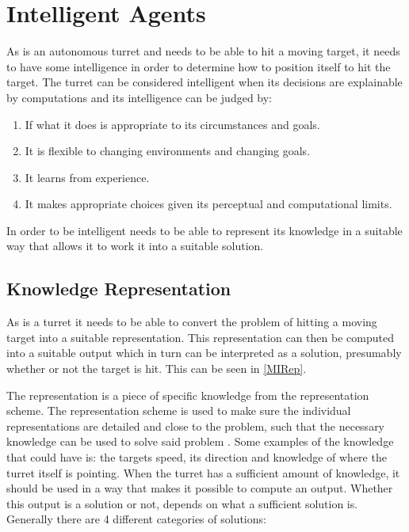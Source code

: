 \section{Intelligent Agents}
 
As \namep is an autonomous turret and needs to be able to hit a moving target,
it needs to have some intelligence in order to determine how to position itself
to hit the target. The turret can be considered intelligent
\citep[ch.1.1]{MIBook} when its decisions are explainable by computations and
its intelligence can be judged by:

\begin{enumerate}
  \item If what it does is appropriate to its circumstances and goals.
  \item It is flexible to changing environments and changing goals.
  \item It learns from experience.
  \item It makes appropriate choices given its perceptual and computational
  limits.
\end{enumerate}

In order to be intelligent \name needs to be able to represent its knowledge in
a suitable way that allows it to work it into a suitable solution. 

\subsection{Knowledge Representation}\label{KR}

As \name is a turret it needs to be able to convert the problem of hitting a
moving target into a suitable representation. This representation can then be
computed into a suitable output which in turn can be interpreted as
a solution, presumably whether or not the target is hit. This can be seen in
\autoref{MIRep}.


The representation is a piece of specific knowledge from the representation
scheme. The representation scheme is used to make sure the individual
representations are detailed and close to the problem, such that the necessary
knowledge can be used to solve said problem \citep{MIBook}. Some examples of the
knowledge that \name could have is: the targets speed, its direction and
knowledge of where the turret itself is pointing. When the turret has a
sufficient amount of knowledge, it should be used in a way that makes it
possible to compute an output. Whether this output is a solution or not, depends
on what a sufficient solution is. Generally there are 4 different categories of
solutions:

